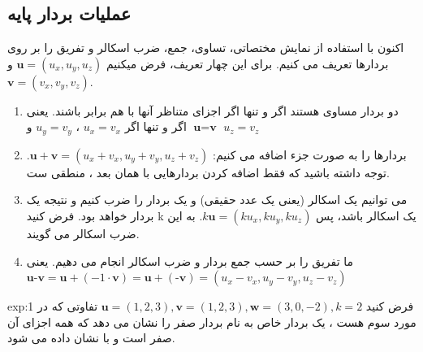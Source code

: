 \subsection{\textbf{عملیات بردار پایه}}
{
    \Large
    \begin{spacing}{1.5}
        اکنون با استفاده از نمایش مختصاتی، تساوی، جمع، ضرب اسکالر و تفریق را بر روی بردارها تعریف می کنیم.
        برای این چهار تعریف، فرض میکنیم $\textbf{u}=(u_{x},u_{y},u_{z})$ و  $\textbf{v}=(v_{x},v_{y},v_{z})$.

        \begin{enumerate}[label=\textbf{\arabic*}.]
            \item {دو بردار مساوی هستند اگر و تنها اگر اجزای متناظر آنها با هم برابر باشند.
            یعنی $\textbf{u}=\textbf{v}$ اگر و تنها اگر $u_{x}=v_{x}$ ، $u_{y}=v_{y}$ و $u_{z}=v_{z}$}
            \item {بردارها را به صورت جزء اضافه می کنیم: $\textbf{u}+\textbf{v}=(u_{x}+v_{x},u_{y}+v_{y},u_{z}+v_{z})$.
            توجه داشته باشید که فقط اضافه کردن بردارهایی با همان بعد ، منطقی ست.}
            \item {می توانیم یک اسکالر (یعنی یک عدد حقیقی) و یک بردار را ضرب کنیم و نتیجه یک بردار خواهد بود.
            فرض کنید k یک اسکالر باشد، پس $k\textbf{u}=(ku_{x},ku_{y},ku_{z})$. به این ضرب اسکالر می گویند.}
            \item {ما تفریق را بر حسب جمع بردار و ضرب اسکالر انجام می دهیم.
            یعنی\\$\textbf{u}\textbf{-v}=\textbf{u}+(-1\cdot\textbf{v})=\textbf{u}+(\textbf{-v})=(u_{x}-v_{x},u_{y}-v_{y},u_{z}-v_{z})$}
        \end{enumerate}

        \textbf{\vspace{-10pt}}
        \begin{example}{exp:1}
            \Large
            فرض کنید $\textbf{u}=(1,2,3), \textbf{v}=(1,2,3), \textbf{w}=(3,0,-2), k=2$
            تفاوتی که در مورد سوم هست ، یک بردار خاص به نام بردار صفر را نشان می دهد که همه اجزای آن صفر است و با  نشان داده می شود.
        \end{example}


\end{spacing}}
